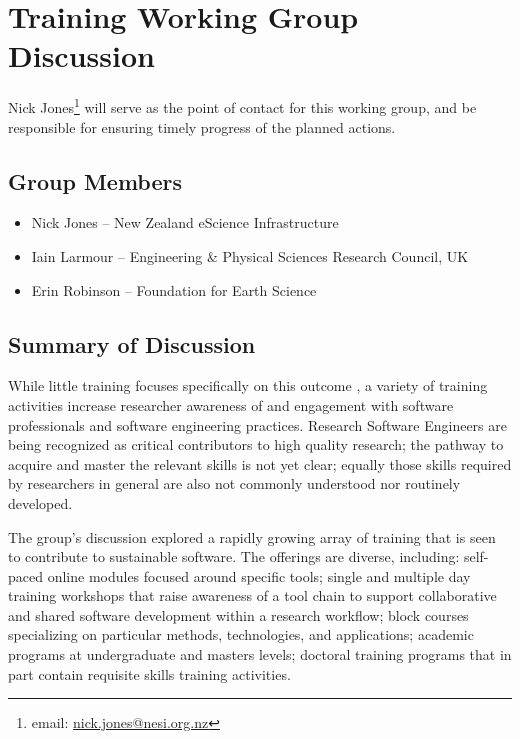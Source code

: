 \section{Training Working Group Discussion}
\label{sec:appendix_training}

Nick Jones\footnote{email:
\href{mailto:nick.jones@nesi.org.nz}{nick.jones@nesi.org.nz}} will serve as the
point of contact for this working group, and be responsible for ensuring timely
progress of the planned actions.

\subsection{Group Members}
\begin{itemize}
\item Nick Jones -- New Zealand eScience Infrastructure
\item Iain Larmour -- Engineering \& Physical Sciences Research Council, UK
\item Erin Robinson -- Foundation for Earth Science
\end{itemize}

\subsection{Summary of Discussion}


While little training focuses specifically on this outcome , a variety of training activities increase researcher awareness of
and engagement with software professionals and software engineering practices.
Research Software Engineers are being recognized as critical contributors to
high quality research; the pathway to acquire and master the relevant skills
is not yet clear; equally those skills required by researchers in general are
also not commonly understood nor routinely developed.

The group's discussion explored a rapidly growing array of training that is seen
to contribute to sustainable software. The offerings are diverse, including:
self-paced online modules focused around specific tools; single and multiple day
training workshops that raise awareness of a tool chain to support collaborative
and shared software development within a research workflow; block courses
specializing on particular methods, technologies, and applications; academic
programs at undergraduate and masters levels; doctoral training programs that in
part contain requisite skills training activities.

